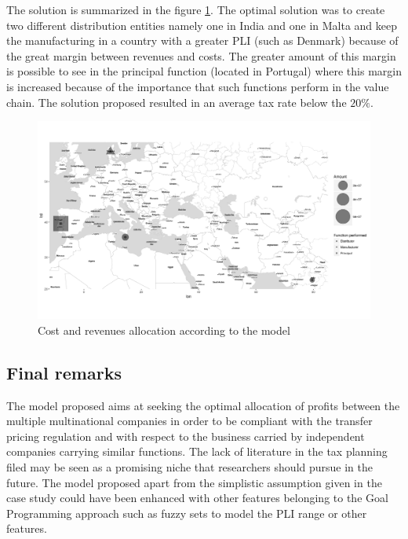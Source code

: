 \begin{doublespace}
The solution is summarized in the figure \ref{fig:allocationmap}. The optimal solution was to create two different distribution entities namely one in India and one in Malta and keep the manufacturing in a country with a greater PLI (such as Denmark) because of the great margin between revenues and costs. The greater amount of this margin is possible to see in the principal function (located in Portugal) where this margin is increased because of the importance that such functions perform in the value chain. The solution proposed resulted in an average tax rate below the $20\%$.

\begin{figure}
\centering
\includegraphics[width=\textwidth]{Images/AllocationMap.png}
\caption{Cost and revenues allocation according to the model}
\label{fig:allocationmap}
\end{figure}

\subsection{Final remarks}
The model proposed aims at seeking the optimal allocation of profits between the multiple multinational companies in order to be compliant with the transfer pricing regulation and with respect to the business carried by independent companies carrying similar functions. The lack of literature in the tax planning filed may be seen as a promising niche that researchers should pursue in the future. The model proposed apart from the simplistic assumption given in the case study could have been enhanced with other features belonging to the Goal Programming approach such as fuzzy sets to model the PLI range or other features. 

\end{doublespace}
